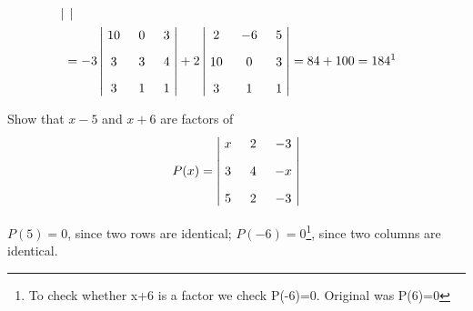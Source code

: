 \documentclass{amsbook}
\begin{document}
\begin{hEnumerateArabic}
\begin{hSolution}
\begin{align*}
\begin{vmatrix}
        \end{vmatrix}
        \\%
        &= -3
        \begin{vmatrix}
            \xymatrix @R=3mm @C=3mm {
                10 &  0 &  3 \\
                 3 &  3 &  4 \\
                 3 &  1 &  1
            }
        \end{vmatrix}
        +2
        \begin{vmatrix}
            \xymatrix @R=3mm @C=3mm {
                 2 & -6 &  5 \\
                10 &  0 &  3 \\
                 3 &  1 &  1
            }
        \end{vmatrix}
        = 84 + 100 = 184 \text{\footnotemark}
    \end{align*}
    \end{hSolution}
    
    \setcounter{enumi}{5}
    \item Show that $x-5$ and $x+6$ are factors of
    \begin{align*}
        P(x) =
        \begin{vmatrix}
            \xymatrix @R=3mm @C=3mm {
                 x &  2 & -3 \\
                 3 &  4 & -x \\
                 5 &  2 & -3
            }
        \end{vmatrix}
    \end{align*}
    
    \begin{hSolution}
    \par $P(5) = 0$, since two rows are identical; $P(-6) = 0$\footnote{To check whether x+6 is a factor we check P(-6)=0. Original was P(6)=0}, since two columns are identical.
    \end{hSolution}
    

\end{hEnumerateArabic}
\end{document}
